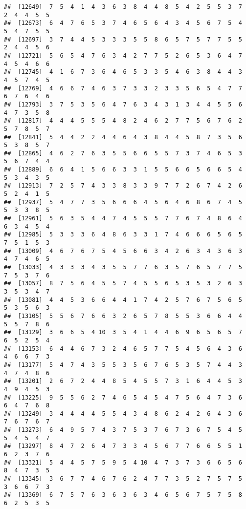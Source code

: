 \documentclass[
]{book}
\begin{document}
\begin{verbatim}
##  [12649]  7  5  4  1  4  3  6  3  8  4  4  8  5  4  2  5  5  3  7  2  4  4  5  5
##  [12673]  6  4  7  6  5  3  7  4  6  5  6  4  3  4  5  6  7  5  4  5  4  7  5  5
##  [12697]  3  7  4  4  5  3  3  3  5  5  8  6  5  7  5  7  7  5  5  2  4  4  5  6
##  [12721]  5  6  5  4  7  6  3  4  2  7  7  5  2  6  5  3  6  4  7  4  5  4  6  6
##  [12745]  4  1  6  7  3  6  4  6  5  3  3  5  4  6  3  8  4  4  3  4  5  7  4  5
##  [12769]  4  6  6  7  4  6  3  7  3  3  2  3  3  5  6  5  4  7  7  6  7  6  4  6
##  [12793]  3  7  5  3  5  6  4  7  6  3  4  3  1  3  4  4  5  5  6  4  7  3  5  8
##  [12817]  4  4  4  5  5  5  4  8  2  4  6  2  7  7  5  6  7  6  2  5  7  8  5  7
##  [12841]  5  4  4  2  2  4  4  6  4  3  8  4  4  5  8  7  3  5  6  5  3  8  5  7
##  [12865]  4  6  2  7  6  3  5  5  6  6  5  5  7  3  7  4  6  5  3  5  6  7  4  4
##  [12889]  6  6  4  1  5  6  6  3  3  1  5  5  6  6  5  6  6  5  4  5  3  4  3  5
##  [12913]  7  2  5  7  4  3  3  8  3  3  9  7  7  2  6  7  4  2  6  5  2  4  1  5
##  [12937]  5  4  7  7  3  5  6  6  6  4  5  6  4  6  8  6  7  4  5  5  3  3  8  5
##  [12961]  5  6  3  5  4  4  7  4  5  5  5  7  7  6  7  4  8  6  4  6  3  4  5  4
##  [12985]  5  3  3  3  6  4  8  6  3  3  1  7  4  6  6  6  5  6  5  7  5  1  5  3
##  [13009]  4  6  7  6  7  5  4  5  6  6  3  4  2  6  3  4  3  6  3  4  7  4  6  5
##  [13033]  4  3  3  3  4  3  5  5  7  7  6  3  5  7  6  5  7  7  5  7  5  3  7  6
##  [13057]  8  7  5  6  4  5  5  7  4  5  5  6  5  3  5  3  2  6  3  3  5  3  4  7
##  [13081]  4  4  5  3  6  6  4  4  1  7  4  2  5  7  6  7  5  6  5  5  3  5  6  3
##  [13105]  5  5  6  7  6  6  3  2  6  5  7  8  5  5  3  6  6  4  4  5  5  7  8  6
##  [13129]  3  6  6  5  4 10  3  5  4  1  4  4  6  9  6  5  6  5  7  6  5  2  5  4
##  [13153]  6  4  4  6  7  3  2  4  6  5  7  7  5  4  5  6  4  3  6  4  6  6  7  3
##  [13177]  5  4  7  4  3  5  5  3  5  6  7  6  5  3  5  7  4  4  3  4  7  4  8  6
##  [13201]  2  6  7  2  4  4  8  5  4  5  5  7  3  1  6  4  4  5  3  4  9  4  5  3
##  [13225]  9  5  5  6  2  7  4  6  5  4  5  4  7  5  6  4  7  3  6  6  4  7  6  8
##  [13249]  3  4  4  4  4  5  5  4  3  4  8  6  2  4  2  6  4  3  6  7  6  7  6  7
##  [13273]  6  4  9  5  7  4  3  7  5  3  7  6  7  3  6  7  5  4  5  5  4  5  4  7
##  [13297]  8  4  7  2  6  4  7  3  3  4  5  6  7  7  6  6  5  5  1  6  2  3  7  6
##  [13321]  5  4  4  5  7  5  9  5  4 10  4  7  3  7  3  6  6  5  6  8  4  7  3  5
##  [13345]  3  6  7  7  4  6  7  6  2  4  7  7  3  5  2  7  5  7  5  3  6  6  7  3
##  [13369]  6  7  5  7  6  3  6  3  6  3  4  6  5  6  7  5  7  5  8  6  2  5  3  5

\end{verbatim}
\end{document}
